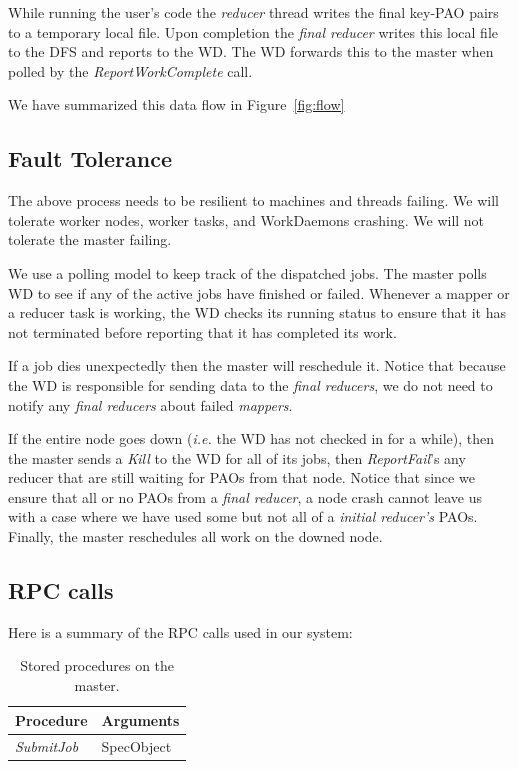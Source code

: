 \documentclass[10pt,letter,final,article,twocolumn]{article} %
\newcommand{\rpc}[1]{\emph{#1}}
\begin{document}
While running the user's code the \emph{reducer} thread writes the final key-PAO pairs to a temporary local file. Upon completion the \emph{final reducer} writes this local file to the DFS and reports to the WD. The WD forwards this to the master when polled by the \rpc{ReportWorkComplete} call.

We have summarized this data flow in Figure~\ref{fig:flow}

\subsection{Fault Tolerance}
The above process needs to be resilient to machines and threads failing. We will tolerate worker nodes, worker tasks, and WorkDaemons crashing. We will not tolerate the master failing.

We use a polling model to keep track of the dispatched jobs. The master polls WD to see if any of the active jobs have finished or failed. Whenever a mapper or a reducer task is working, the WD checks its running status to ensure that it has not terminated before reporting that it has completed its work.

If a job dies unexpectedly then the master will reschedule it. Notice that because the WD is responsible for sending data to the \emph{final reducers}, we do not need to notify any \emph{final reducers} about failed \emph{mappers}. 

If the entire node goes down (\textit{i.e.} the WD has not checked in for a while), then the master sends a \rpc{Kill} to the WD for all of its jobs, then \rpc{ReportFail}'s any reducer that are still waiting for PAOs from that node. Notice that since we ensure that all or no PAOs from a \emph{final reducer}, a node crash cannot leave us with a case where we have used some but not all of a \emph{initial reducer's} PAOs. Finally, the master reschedules all work on the downed node.

\subsection{RPC calls}

Here is a summary of the RPC calls used in our system:

\begin{table}[htdp]
\caption{Stored procedures on the master.}
\begin{center}
\begin{tabular}{|l|l|}\hline
\textbf{Procedure} & \textbf{Arguments}\\\hline
\rpc{SubmitJob} & SpecObject\\
\end{tabular}
\end{center}
\label{tab:master_rpc}
\end{table}%
\end{document}
